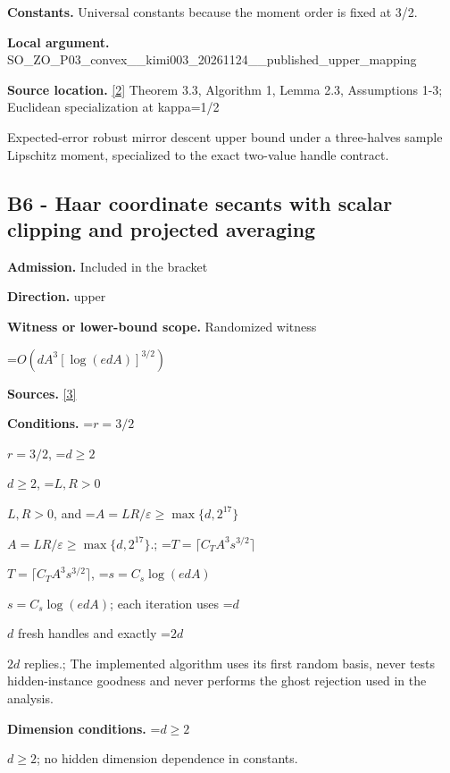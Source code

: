\documentclass[10pt,a4paper]{article}
\newcommand{\AtlasMath}[1]{\par\begingroup\centering\setbox0=\hbox{$\displaystyle #1$}\ifdim\wd0>1.4\linewidth\typeout{ATLAS WIDE FORMULA: \the\wd0}\fi\ifdim\wd0>\linewidth\resizebox{\linewidth}{!}{\box0}\else\box0\fi\par\endgroup}
\newcommand{\AtlasInlineMath}[1]{\begingroup\setbox0=\hbox{$#1$}\ifdim\wd0>.4\linewidth\endgroup\AtlasMath{#1}\else\endgroup$#1$\fi}
\begin{document}
\textbf{Constants.} Universal constants because the moment order is fixed at 3/2.



\textbf{Local argument.} SO\_ZO\_P03\_convex\_\_kimi00\allowbreak{}3\_20261124\_\_published\_up\allowbreak{}per\_mapping



\textbf{Source location.} \href{https://arxiv.org/abs/2304.02442v3}{[2]} Theorem 3.3, Algorithm 1, Lemma 2.3, Assumptions 1-3; Euclidean specialization at kappa=1/2



Expected-error robust mirror descent upper bound under a three-halves sample Lipschitz moment, specialized to the exact two-value handle contract.



\subsection{B6 - Haar coordinate secants with scalar clipping and projected averaging}


\textbf{Admission.} Included in the bracket



\textbf{Direction.} upper



\textbf{Witness or lower-bound scope.} Randomized witness



\AtlasMath{O(dA^3[\log(edA)]^{3/2})}


\textbf{Sources.} \href{https://github.com/WU-Wendao/Colombo/blob/main/colombo_sensorium/Complexity_altas/data/sources/colombo/COLOMBO_KIMI_003/kimi_003.pdf}{[3]}



\textbf{Conditions.} \AtlasInlineMath{r=3/2}, \AtlasInlineMath{d\ge2}, \AtlasInlineMath{L,R>0}, and \AtlasInlineMath{A=LR/\varepsilon\ge\max\{d,2^{17}\}}.; \AtlasInlineMath{T=\lceil C_TA^3s^{3/2}\rceil}, \AtlasInlineMath{s=C_s\log(edA)}; each iteration uses \AtlasInlineMath{d} fresh handles and exactly \AtlasInlineMath{2d} replies.; The implemented algorithm uses its first random basis, never tests hidden-instance goodness and never performs the ghost rejection used in the analysis.



\textbf{Dimension conditions.} \AtlasInlineMath{d\ge2}; no hidden dimension dependence in constants.
\end{document}
